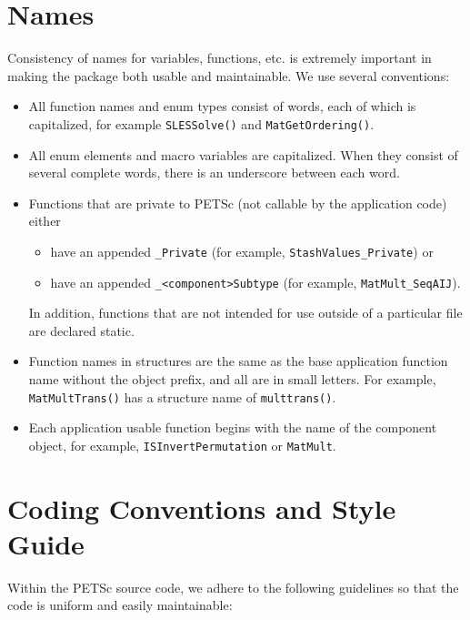 \documentclass[twoside,12pt]{../sty/report_petsc}
\begin{document}
\section{Names}
Consistency of names for variables, functions, etc. is extremely 
important in making the package both usable and maintainable.
We use several conventions:
\begin{itemize}
\item All function names and enum types consist of words, each of 
      which is capitalized, for example {\tt SLESSolve()} and 
      {\tt MatGetOrdering()}.
\item All enum elements and macro variables are capitalized. When
      they consist of several
      complete words, there is an underscore between each word.
\item Functions that are private to PETSc (not callable by the 
      application code) either
      \begin{itemize}
        \item have an appended {\tt \_Private} (for example, 
           {\tt StashValues\_Private}) or
        \item have an appended {\tt \_<component>Subtype} (for example,
           {\tt MatMult\_SeqAIJ}).
      \end{itemize}

      In addition, functions that are not intended for use outside
      of a particular file are declared static.
\item Function names in structures are the same as the base application
      function name without the object prefix, and all are in small letters. 
      For example, {\tt MatMultTrans()} has a structure name of 
      {\tt multtrans()}.
\item Each application usable function begins with the name of the component object, 
      for example, {\tt ISInvertPermutation} or {\tt MatMult}. 
\end{itemize}

\section{Coding Conventions and Style Guide}

Within the PETSc source code, we adhere to the following guidelines
so that the code is uniform and easily maintainable:
\end{document}
